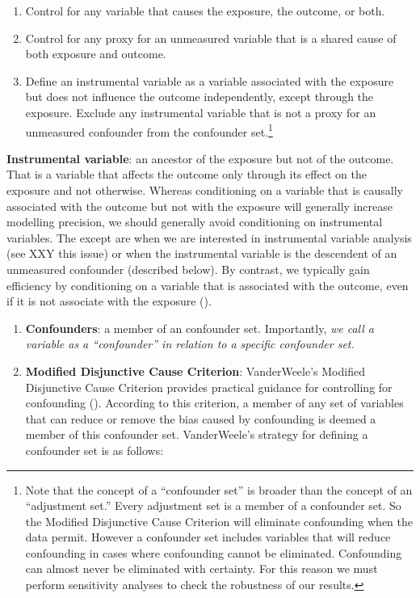 \documentclass[
  singlecolumn,
  9pt]{article}
\providecommand{\tightlist}{%
  \setlength{\itemsep}{0pt}\setlength{\parskip}{0pt}}\usepackage{longtable,booktabs,array}
\begin{document}
\begin{enumerate}
\def\labelenumi{\alph{enumi}.}
\tightlist
\item
  Control for any variable that causes the exposure, the outcome, or
  both.
\item
  Control for any proxy for an unmeasured variable that is a shared
  cause of both exposure and outcome.
\item
  Define an instrumental variable as a variable associated with the
  exposure but does not influence the outcome independently, except
  through the exposure. Exclude any instrumental variable that is not a
  proxy for an unmeasured confounder from the confounder set.\footnote{Note
    that the concept of a ``confounder set'' is broader than the concept
    of an ``adjustment set.'' Every adjustment set is a member of a
    confounder set. So the Modified Disjunctive Cause Criterion will
    eliminate confounding when the data permit. However a confounder set
    includes variables that will reduce confounding in cases where
    confounding cannot be eliminated. Confounding can almost never be
    eliminated with certainty. For this reason we must perform
    sensitivity analyses to check the robustness of our results.}
\end{enumerate}

\textbf{Instrumental variable}: an ancestor of the exposure but not of
the outcome. That is a variable that affects the outcome only through
its effect on the exposure and not otherwise. Whereas conditioning on a
variable that is causally associated with the outcome but not with the
exposure will generally increase modelling precision, we should
generally avoid conditioning on instrumental variables. The except are
when we are interested in instrumental variable analysis (see XXY this
issue) or when the instrumental variable is the descendent of an
unmeasured confounder (described below). By contrast, we typically gain
efficiency by conditioning on a variable that is associated with the
outcome, even if it is not associate with the exposure
().

\begin{enumerate}
\def\labelenumi{\arabic{enumi}.}
\setcounter{enumi}{6}
\item
  \textbf{Confounders}: a member of an confounder set. Importantly,
  \emph{we call a variable as a ``confounder'' in relation to a specific
  confounder set.}
\item
  \textbf{Modified Disjunctive Cause Criterion}: VanderWeele's Modified
  Disjunctive Cause Criterion provides practical guidance for
  controlling for confounding
  (). According to this
  criterion, a member of any set of variables that can reduce or remove
  the bias caused by confounding is deemed a member of this confounder
  set. VanderWeele's strategy for defining a confounder set is as
  follows:
\end{enumerate}
\end{document}
